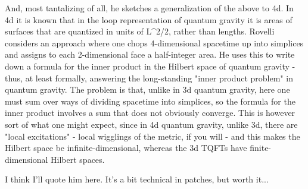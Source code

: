 And, most tantalizing of all, he sketches a generalization of the above
to 4d.  In 4d it is known that in the loop representation of quantum
gravity it is areas of surfaces that are quantized in units of L^2/2,
rather than lengths.  Rovelli considers an approach where one chops
4-dimensional spacetime up into simplices and assigns to each
2-dimensional face a half-integer area.  He uses this to write down a
formula for the inner product in the Hilbert space of quantum gravity -
thus, at least formally, answering the long-standing "inner product
problem" in quantum gravity.  The problem is that, unlike in 3d quantum
gravity, here one must sum over ways of dividing spacetime into
simplices, so the formula for the inner product involves a sum that does
not obviously converge.  This is however sort of what one might expect,
since in 4d quantum gravity, unlike 3d, there are "local excitations" -
local wigglings of the metric, if you will - and this makes the Hilbert
space be infinite-dimensional, whereas the 3d TQFTs have
finite-dimensional Hilbert spaces.  

I think I'll quote him here.  It's a bit technical in patches, but worth
it... 


